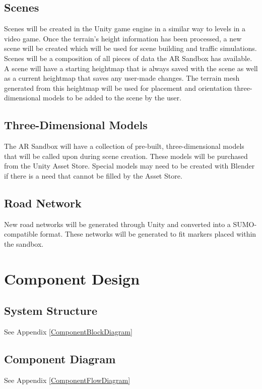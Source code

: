 \documentclass[letterpaper, 10pt, onecolumn, draftclsnofoot]{IEEEtran}
\begin{document}
    \subsection{Scenes}
       Scenes will be created in the Unity game engine in a similar way to levels in a video game. Once the terrain's height information has been processed, a new scene will be created which will be used for scene building and traffic simulations. Scenes will be a composition of all pieces of data the AR Sandbox has available. A scene will have a starting heightmap that is always saved with the scene as well as a current heightmap that saves any user-made changes. The terrain mesh generated from this heightmap will be used for placement and orientation three-dimensional models to be added to the scene by the user.
     \subsection{Three-Dimensional Models}
        The AR Sandbox will have a collection of pre-built, three-dimensional models that will be called upon during scene creation. These models will be purchased from the Unity Asset Store. Special models may need to be created with Blender if there is a need that cannot be filled by the Asset Store.
    \subsection{Road Network}
        New road networks will be generated through Unity and converted into a SUMO-compatible format. These networks will be generated to fit markers placed within the sandbox. 
    
\section{Component Design}
    \subsection{System Structure}
        \begin{center}
            See Appendix \ref{ComponentBlockDiagram}
        \end{center}

    \subsection{Component Diagram}
        \begin{center}
            See Appendix \ref{ComponentFlowDiagram}
        \end{center}
        
\end{document}
